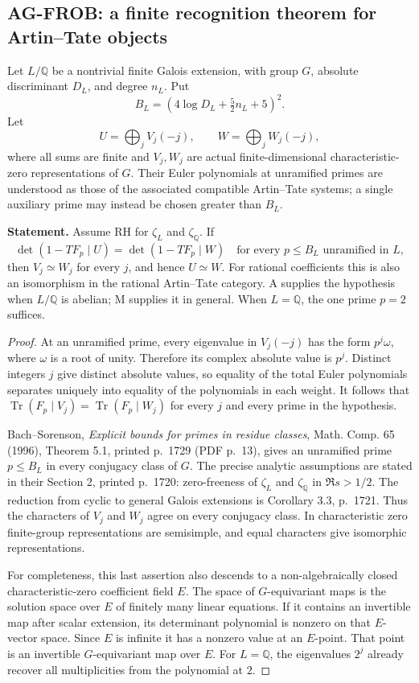\documentclass[11pt,a4paper]{article}
\begin{document}
\subsection{AG-FROB: a finite recognition theorem for Artin--Tate objects}
\label{ag:frob}

Let $L/\mathbb Q$ be a nontrivial finite Galois extension, with group $G$,
absolute discriminant $D_L$, and degree $n_L$. Put
\[
 B_L=(4\log D_L+\tfrac52 n_L+5)^2.
\]
Let
\[
 U=\bigoplus_j V_j(-j),\qquad W=\bigoplus_j W_j(-j),
\]
where all sums are finite and $V_j,W_j$ are actual finite-dimensional
characteristic-zero representations of $G$. Their Euler polynomials at
unramified primes are understood as those of the associated compatible
Artin--Tate systems; a single auxiliary prime may instead be chosen greater
than $B_L$.

\textbf{Statement.} Assume RH for $\zeta_L$ and $\zeta_{\mathbb Q}$.
If
\[
 \det(1-TF_p\mid U)=\det(1-TF_p\mid W)
 \quad\text{for every }p\le B_L\text{ unramified in }L,
\]
then $V_j\simeq W_j$ for every $j$, and hence $U\simeq W$.
For rational coefficients this is also an isomorphism in the rational
Artin--Tate category. A supplies the hypothesis when $L/\mathbb Q$ is
abelian; M supplies it in general. When $L=\mathbb Q$, the one prime $p=2$
suffices.

\begin{proof}
At an unramified prime, every eigenvalue in $V_j(-j)$ has the form
$p^j\omega$, where $\omega$ is a root of unity. Therefore its complex
absolute value is $p^j$. Distinct integers $j$ give distinct absolute
values, so equality of the total Euler polynomials separates uniquely into
equality of the polynomials in each weight. It follows that
$\operatorname{Tr}(F_p\mid V_j)=\operatorname{Tr}(F_p\mid W_j)$ for every
$j$ and every prime in the hypothesis.

Bach--Sorenson, \emph{Explicit bounds for primes in residue classes},
Math. Comp. 65 (1996), Theorem 5.1, printed p.~1729 (PDF p.~13), gives
an unramified prime $p\le B_L$ in every conjugacy class of $G$.
The precise analytic assumptions are stated in their Section 2,
printed p.~1720: zero-freeness of $\zeta_L$ and $\zeta_{\mathbb Q}$ in
$\Re s>1/2$. The reduction from cyclic to general Galois extensions is
Corollary 3.3, p.~1721. Thus the characters of $V_j$ and $W_j$ agree on
every conjugacy class. In characteristic zero finite-group representations
are semisimple, and equal characters give isomorphic representations.

For completeness, this last assertion also descends to a non-algebraically
closed characteristic-zero coefficient field $E$. The space of
$G$-equivariant maps is the solution space over $E$ of finitely many linear
equations. If it contains an invertible map after scalar extension, its
determinant polynomial is nonzero on that $E$-vector space. Since $E$ is
infinite it has a nonzero value at an $E$-point. That point is an invertible
$G$-equivariant map over $E$. For $L=\mathbb Q$, the eigenvalues $2^j$
already recover all multiplicities from the polynomial at $2$.
\end{proof}
\end{document}
